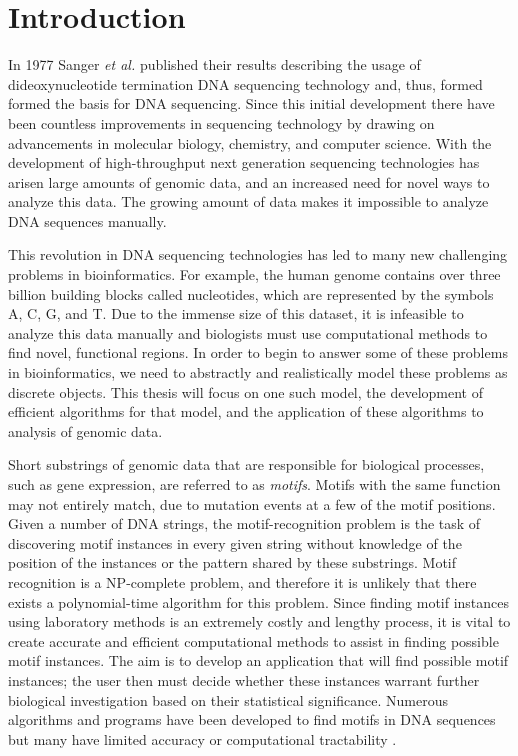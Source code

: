 \chapter{Introduction} \label{chapters:intro}

In 1977 Sanger {\em et al.} \cite{sanger} published their results describing the usage of dideoxynucleotide termination DNA sequencing technology and, thus, formed formed the basis for DNA sequencing. Since this initial development there have been countless improvements in sequencing technology by drawing on advancements in molecular biology, chemistry, and computer science.  With the development of high-throughput next generation sequencing technologies has arisen large amounts of genomic data, and an increased need for novel ways to analyze this data. The growing amount of data makes it impossible to analyze DNA sequences manually. 

This revolution in DNA sequencing technologies has led to many new challenging problems in bioinformatics. For example, the human genome contains over three billion building blocks called nucleotides, which are represented by the symbols A, C, G, and T.  Due to the immense size of this dataset, it is infeasible to analyze this data manually and biologists must use computational methods to find novel, functional regions. In order to begin to answer some of these problems in bioinformatics, we need to abstractly and realistically model these problems as discrete objects.  This thesis will focus on one such model, the development of efficient algorithms for that model, and the application of these algorithms to analysis of genomic data. 

Short substrings of genomic data that are responsible for biological processes, such as gene expression, are referred to as {\em motifs}.  Motifs with the same function may not entirely match, due to mutation events at a few of the motif positions. Given a number of DNA strings, the motif-recognition problem is the task of discovering motif instances in every given string without knowledge of the position of the instances or the pattern shared by these substrings.  Motif recognition is a NP-complete problem, and therefore it is unlikely that there exists a polynomial-time algorithm for this problem. Since finding motif instances using laboratory methods is an extremely costly and lengthy process, it is vital to create accurate and efficient computational methods to assist in finding possible motif instances. The aim is to develop an application that will find possible motif instances; the user then must decide whether these instances warrant further biological investigation based on their statistical significance. Numerous algorithms and programs have been developed to find motifs in DNA sequences but many have limited accuracy or computational tractability \cite{BT02,PS00}.

